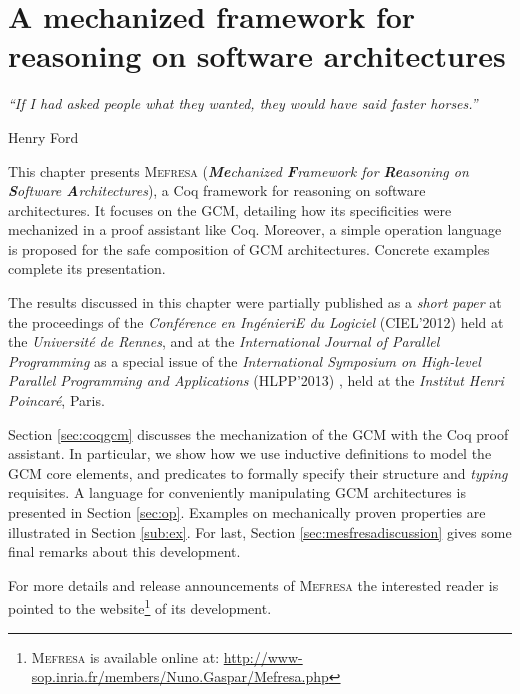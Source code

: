 \chapter{A mechanized framework for reasoning on software architectures}
\label{chap:mefresa} 
\epigraph{\textit{“If I had asked people what they wanted, they would have said faster horses.”}}{Henry Ford}
	
\minitoc

	
This chapter presents \textsc{Mefresa} (\textit{\textbf{Me}chanized \textbf{F}ramework for \textbf{Re}asoning on \textbf{S}oftware \textbf{A}rchitectures}), a Coq framework for reasoning on software architectures.
	It focuses on the \ac{GCM}, detailing how its specificities were mechanized in a proof assistant like Coq. 
	Moreover, a simple \textsf{operation} language is proposed for the safe composition of 
	\ac{GCM} architectures. Concrete examples complete its presentation.
		
	The results discussed in this chapter were partially published as a \textit{short paper} at the proceedings
	of the \textit{Conf\'erence en Ing\'enieriE du Logiciel} (CIEL'2012) \cite{gaspar:hal-00725291} held
	at the \textit{Universit\'e de Rennes},
	and at the \textit{International Journal of Parallel Programming} as a special issue
	of the \textit{International Symposium on High-level Parallel Programming and Applications} (HLPP'2013) \cite{GASHENMAD:IJPP13},
	held at the \textit{Institut Henri Poincar\'e}, Paris.	
	
	Section \ref{sec:coqgcm} discusses the mechanization of the \ac{GCM} with the Coq
	proof assistant. In particular, we show how we use inductive definitions to model
	the \ac{GCM} core elements, and predicates to formally specify their structure
	and \textit{typing} requisites.
	A language for conveniently manipulating \ac{GCM} architectures
	is presented in Section \ref{sec:op}. Examples on mechanically proven properties
	are illustrated in Section \ref{sub:ex}.	For last, Section \ref{sec:mesfresadiscussion} gives
	some final remarks about this development.
	 
		
	For more details and release announcements of \textsc{Mefresa} 
	the interested reader is pointed to the website\footnote{\textsc{Mefresa}  is available online at: 
	\url{http://www-sop.inria.fr/members/Nuno.Gaspar/Mefresa.php}} of its development. 
